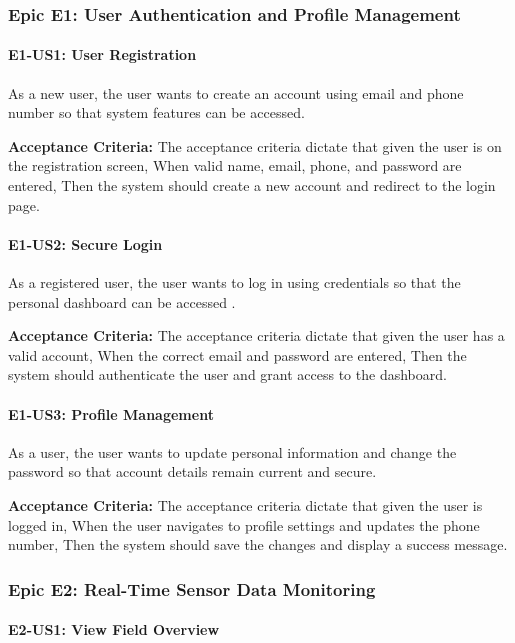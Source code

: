 \subsubsection{Epic E1: User Authentication and Profile Management}

\paragraph{E1-US1: User Registration} As a new user, the user wants 
to create an account using email and phone number so that system 
features can be accessed.

\textbf{Acceptance Criteria:} The acceptance criteria dictate that given the user is on the registration screen, When valid name, email, phone, and password are entered, Then the system should create a new account and redirect to the login page.


\paragraph{E1-US2: Secure Login} As a registered user, the user 
wants to log in using credentials so that the personal dashboard can 
be accessed \cite{jwtauth2017}.

\textbf{Acceptance Criteria:} The acceptance criteria dictate that given the user has a valid account, When the correct email and password are entered, Then the system should authenticate the user and grant access to the dashboard.


\paragraph{E1-US3: Profile Management} As a user, the user wants to 
update personal information and change the password so that account 
details remain current and secure.

\textbf{Acceptance Criteria:} The acceptance criteria dictate that given the user is logged in, When the user navigates to profile settings and updates the phone number, Then the system should save the changes and display a success message.


\subsubsection{Epic E2: Real-Time Sensor Data Monitoring}

\paragraph{E2-US1: View Field Overview}

